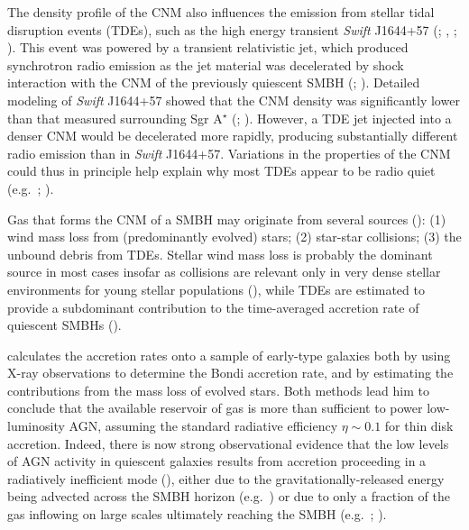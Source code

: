 \documentclass[usenatbib,fleqn]{mn2e}
\begin{document}
The density profile of the CNM also influences the emission from
stellar tidal disruption events (TDEs), such as the high energy
transient {\it Swift} J1644+57 (\citealt{Levan+11};
\citealt{Bloom+11}, \citealt{Burrows+11}; \citealt{Zauderer+11}).
This event was powered by a transient relativistic jet, which produced
synchrotron radio emission as the jet material was decelerated by
shock interaction with the CNM of the previously quiescent SMBH
(\citealt{Giannios&Metzger11}; \citealt{Zauderer+11}).  Detailed
modeling of {\it Swift} J1644+57 showed that the CNM density was
significantly lower than that measured surrounding Sgr A$^{\star}$
(\citealt{Metzger+12}; \citealt{Berger+12}).  However, a TDE jet
injected into a denser CNM would be decelerated more rapidly,
producing substantially different radio emission than in {\it Swift}
J1644+57.  Variations in the properties of the CNM could thus in
principle help explain why most TDEs appear to be radio quiet
(e.g.~\citealt{Bower+13}; \citealt{VanVelzen+13}).

Gas that forms the CNM of a SMBH may originate from several sources
(\citealt{Ho:2009a}): (1) wind mass loss from (predominantly evolved)
stars; (2) star-star collisions; (3) the unbound debris from TDEs.
Stellar wind mass loss is probably the dominant source in most cases
insofar as collisions are relevant only in very dense stellar
environments for young stellar populations (\citealt{Rubin&Loeb11}),
while TDEs are estimated to provide a subdominant contribution to the
time-averaged accretion rate of quiescent SMBHs
(\citealt{MacLeod+13}).

\citet{Ho:2009a} calculates the accretion rates onto a sample of
early-type galaxies both by using X-ray observations to determine the
Bondi accretion rate, and by estimating the contributions from the
mass loss of evolved stars.  Both methods lead him to conclude that
the available reservoir of gas is more than sufficient to power
low-luminosity AGN, assuming the standard radiative efficiency $\eta
\sim 0.1$ for thin disk accretion.  Indeed, there is now strong
observational evidence that the low levels of AGN activity in
quiescent galaxies results from accretion proceeding in a radiatively
inefficient mode (\citealt{Yuan&Narayan14}), either due to the
gravitationally-released energy being advected across the SMBH horizon
(e.g.~\citealt{Narayan&Yi95}) or due to only a fraction of the gas
inflowing on large scales ultimately reaching the SMBH
(e.g.~\citealt{Blandford&Begelman99}; \citealt{Li+13}).
\end{document}
